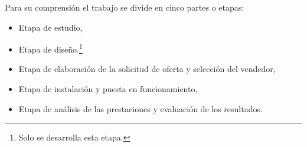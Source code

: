 





Para su comprensión el trabajo se divide en cinco partes o etapas:
\begin{itemize}
\item Etapa de estudio,
\item Etapa de diseño.\footnote{Solo se desarrolla esta etapa.}
\item Etapa de elaboración de la solicitud de oferta y selección del vendedor,
\item Etapa de instalación y puesta en funcionamiento,
\item Etapa de análisis de las prestaciones y evaluación de los resultados.
\end{itemize}
 
